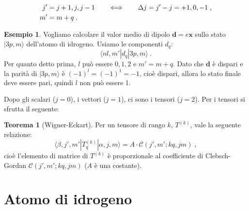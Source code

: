 \documentclass[12pt,a4paper]{report}
\theoremstyle{definition}
\newtheorem{thm}{Teorema}[section]
\newtheorem{exm}{Esempio}
\numberwithin{equation}{section}
\newcommand{\bra}{\langle}
\newcommand{\ket}{\rangle}
\begin{document}
\begin{align}
j'&=j+1,j,j-1 \qquad \Longleftrightarrow \qquad \Delta j=j'-j=+1,0,-1 \notag\;, \\
m'&= m+q\;.
\end{align}
\begin{exm}
Vogliamo calcolare il valor medio di dipolo $\mathbf{d}=e\mathbf{x}$ sullo stato $|3p,m\ket$ dell'atomo di idrogeno. Usiamo le componenti $d_q$:
\begin{equation}
\bra nl,m'|d_q|3p,m\ket\;.
\end{equation}
Per quanto detto prima, $l$ può essere $0,1,2$ e $m'=m+q$. Dato che $\mathbf{d}$ è dispari e la parità di $|3p,m\ket$ è $(-1)^l=(-1)^1=-1$, cioè dispari, allora lo stato finale deve essere pari, quindi $l$ non può essere 1.
\end{exm}
Dopo gli scalari ($j=0$), i vettori ($j=1$), ci sono i tensori ($j=2$). Per i tensori si sfrutta il seguente:
\begin{thm}[Wigner-Eckart] Per un tensore di rango $k$, $T^{(k)}$, vale la seguente relazione:
\begin{equation}
\bra \beta,j',m'|T_q^{(k)}|\alpha,j,m\ket =A\cdot \mathcal{C}(j',m';kq,jm)\;,
\end{equation}
cioè l'elemento di matrice di $T^{(k)}$ è proporzionale al coefficiente di Clebsch-Gordan $\mathcal{C}(j',m';kq,jm)$ ($A$ è una costante).
\end{thm}
\chapter{Atomo di idrogeno}
\end{document}
